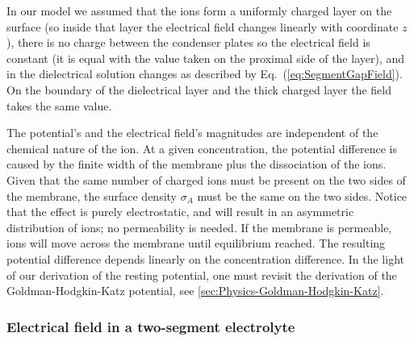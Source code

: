 In our model we assumed that the ions form a uniformly charged layer
on the surface (so inside that layer the electrical field changes linearly with coordinate $z$), there is no charge between the condenser plates so the electrical field is constant (it is equal
with the value taken on the proximal side of the layer),
and in the dielectrical solution changes as described by  Eq.~(\ref{eq:SegmentGapField}). On the boundary of the 
dielectrical layer and the thick charged layer the field takes the same value.

%



The potential's and the electrical field's magnitudes are independent of the chemical nature of the ion.
At a given concentration, the potential difference is caused by the finite width of the membrane plus the dissociation of the ions.
Given that the same number of charged ions must be present
on the two sides of the membrane, the surface density $\sigma_A$ must be the same on the two sides. 
Notice that the effect is purely electrostatic, and will result in an asymmetric distribution of ions; no permeability is needed. If the membrane is permeable, ions will
move across the membrane until equilibrium reached.
The resulting potential difference depends linearly on the concentration difference. In the light of our derivation of 
the resting potential, one must revisit the derivation of the Goldman-Hodgkin-Katz potential, see \ref{sec:Physics-Goldman-Hodgkin-Katz}.

\subsubsection[Electrical field]{Electrical field in a two-segment electrolyte\label{sec:Physics-ElectricalField}}

